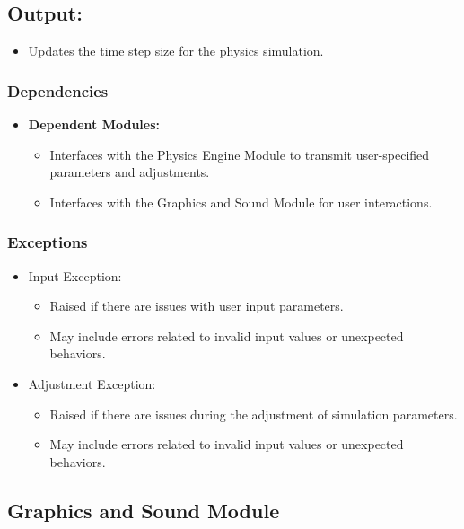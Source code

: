 \documentclass[12pt, titlepage]{article}
\begin{document}
\subsection*{Output:}
\begin{itemize}
  \item Updates the time step size for the physics simulation.
\end{itemize}

\subsubsection{Dependencies}
\begin{itemize}
  \item \textbf{Dependent Modules:}
    \begin{itemize}
  \item Interfaces with the Physics Engine Module to transmit user-specified parameters and adjustments.
  \item Interfaces with the Graphics and Sound Module for user interactions.
    \end{itemize}
\end{itemize}

\subsubsection{Exceptions}
\begin{itemize}
  \item Input Exception:
    \begin{itemize}
  \item Raised if there are issues with user input parameters.
  \item May include errors related to invalid input values or unexpected behaviors.
    \end{itemize}


\item{Adjustment Exception:}
\begin{itemize}
  \item Raised if there are issues during the adjustment of simulation parameters.
  \item May include errors related to invalid input values or unexpected behaviors.
\end{itemize}
\end{itemize}

\subsection{Graphics and Sound Module}
\end{document}
